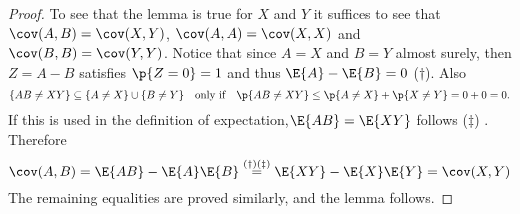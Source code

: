 \documentclass[11pt,english,a4paper]{article}
\begin{document}
\begin{proof}
To see that the lemma is true for $X$ and $Y$ it suffices to see that $\cov (A,B) = \cov (X,Y)$, $\cov (A,A) = \cov (X,X)$ and $\cov (B,B) = \cov (Y,Y)$. Notice that since $A=X$ and $B=Y$ almost surely, then $Z = A-B $ satisfies $\p{Z=0} = 1$ and thus $\E{A} - \E{B} = 0$ ($\dagger$). Also 
\[
\{AB \neq XY\} \subseteq \{ A\neq X \} \cup \{ B \neq Y \} \quad \text{only if} \quad \p{AB \neq XY} \leq \p{A\neq X} + \p{X\neq Y} = 0 + 0 = 0. 
\]
If this is used in the definition of expectation,$\E{AB} = \E{XY}$ follows ($\ddagger$) \parencite{devore_modern_2012}. Therefore
\[
\cov (A,B) = \E{AB} - \E{A}\E{B} \stackrel{(\dagger)(\ddagger)}{=} \E{XY} - \E{X}\E{Y} = \cov (X,Y)
\]
The remaining equalities are proved similarly, and the lemma follows.
\end{proof}
\printbibliography
\end{document}
